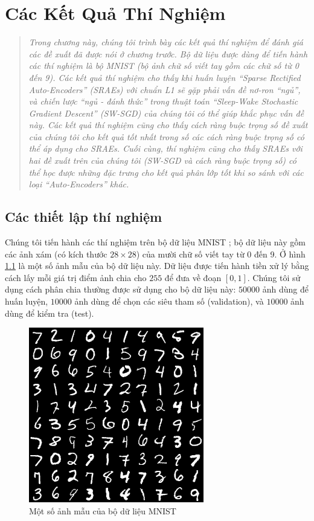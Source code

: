 \chapter{Các Kết Quả Thí Nghiệm}
\ifpdf
    \graphicspath{{Chapter4/Chapter4Figs/PNG/}{Chapter4/Chapter4Figs/PDF/}{Chapter4/Chapter4Figs/}}
\else
    \graphicspath{{Chapter4/Chapter4Figs/EPS/}{Chapter4/Chapter4Figs/}}
\fi
\label{chap_4}
\begin{quote}
\textit{Trong chương này, chúng tôi trình bày các kết quả thí nghiệm để đánh giá các đề xuất đã được nói ở chương trước. Bộ dữ liệu được dùng để tiến hành các thí nghiệm là bộ MNIST (bộ ảnh chữ số viết tay gồm các chữ số từ 0 đến 9). Các kết quả thí nghiệm cho thấy khi huấn luyện ``Sparse Rectified Auto-Encoders'' (SRAEs) với chuẩn L1 sẽ gặp phải vấn đề nơ-ron ``ngủ'', và chiến lược ``ngủ - đánh thức'' trong thuật toán ``Sleep-Wake Stochastic Gradient Descent'' (SW-SGD) của chúng tôi có thể giúp khắc phục vấn đề này. Các kết quả thí nghiệm cũng cho thấy cách ràng buộc trọng số đề xuất của chúng tôi cho kết quả tốt nhất trong số các cách ràng buộc trọng số có thể áp dụng cho SRAEs. Cuối cùng, thí nghiệm cũng cho thấy SRAEs với hai đề xuất trên của chúng tôi (SW-SGD và cách ràng buộc trọng số) có thể học được những đặc trưng cho kết quả phân lớp tốt khi so sánh với các loại ``Auto-Encoders'' khác.}
\end{quote}
\section{Các thiết lập thí nghiệm}
Chúng tôi tiến hành các thí nghiệm trên bộ dữ liệu MNIST \cite{MNIST}; bộ dữ liệu này gồm các ảnh xám (có kích thước $28 \times 28$) của mười chữ số viết tay từ 0 đến 9. Ở hình \ref{fig_MNIST} là một số ảnh mẫu của bộ dữ liệu này. Dữ liệu được tiến hành tiền xử lý bằng cách lấy mỗi giá trị điểm ảnh chia cho $255$ để đưa về đoạn $[0, 1]$. Chúng tôi sử dụng cách phân chia thường được sử dụng cho bộ dữ liệu này: $50000$ ảnh dùng để huấn luyện, $10000$ ảnh dùng để chọn các siêu tham số (validation), và $10000$ ảnh dùng để kiểm tra (test).

\begin{figure}
	\centering
	\includegraphics{MNIST}
	\caption{Một số ảnh mẫu của bộ dữ liệu MNIST}
	\label{fig_MNIST}
\end{figure}

